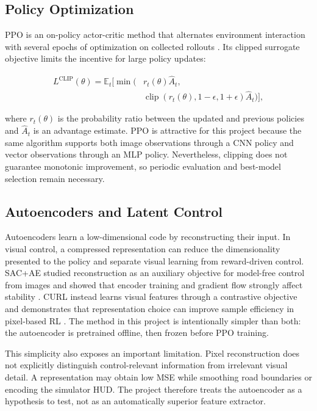 \documentclass[10pt,twocolumn,a4paper]{article}
\begin{document}
\subsection{Policy Optimization}

PPO is an on-policy actor-critic method that alternates environment interaction
with several epochs of optimization on collected rollouts
\cite{schulman2017ppo}. Its clipped surrogate objective limits the incentive for
large policy updates:

\begin{equation}
\begin{aligned}
L^{\mathrm{CLIP}}(\theta)=\mathbb{E}_{t}\big[
\min\big(&r_t(\theta)\hat{A}_t,\\
&\operatorname{clip}(r_t(\theta),1-\epsilon,1+\epsilon)\hat{A}_t
\big)\big],
\end{aligned}
\end{equation}

where $r_t(\theta)$ is the probability ratio between the updated and previous
policies and $\hat{A}_t$ is an advantage estimate. PPO is attractive for this
project because the same algorithm supports both image observations through a
CNN policy and vector observations through an MLP policy. Nevertheless, clipping
does not guarantee monotonic improvement, so periodic evaluation and best-model
selection remain necessary.

\subsection{Autoencoders and Latent Control}

Autoencoders learn a low-dimensional code by reconstructing their input. In
visual control, a compressed representation can reduce the dimensionality
presented to the policy and separate visual learning from reward-driven control.
SAC+AE studied reconstruction as an auxiliary objective for model-free control
from images and showed that encoder training and gradient flow strongly affect
stability \cite{yarats2021sacae}. CURL instead learns visual features through a
contrastive objective and demonstrates that representation choice can improve
sample efficiency in pixel-based RL \cite{laskin2020curl}. The method in this
project is intentionally simpler than both: the autoencoder is pretrained
offline, then frozen before PPO training.

This simplicity also exposes an important limitation. Pixel reconstruction does
not explicitly distinguish control-relevant information from irrelevant visual
detail. A representation may obtain low MSE while smoothing road boundaries or
encoding the simulator HUD. The project therefore treats the autoencoder as a
hypothesis to test, not as an automatically superior feature extractor.
\end{document}

